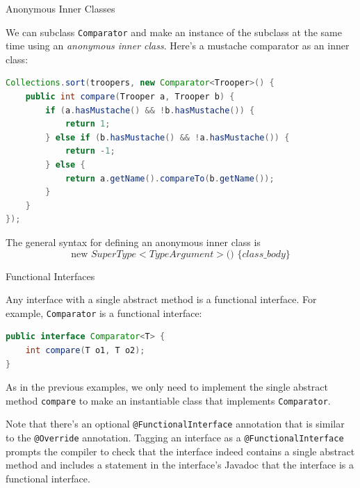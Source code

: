 \documentclass{beamer}
\begin{document}
\begin{frame}[fragile]{Anonymous Inner Classes}

We can subclass {\tt Comparator} and make an instance of the subclass at the same time using an {\it anonymous inner class}.  Here's a mustache comparator as an inner class:

\begin{lstlisting}[language=Java]
Collections.sort(troopers, new Comparator<Trooper>() {
    public int compare(Trooper a, Trooper b) {
        if (a.hasMustache() && !b.hasMustache()) {
            return 1;
        } else if (b.hasMustache() && !a.hasMustache()) {
            return -1;
        } else {
            return a.getName().compareTo(b.getName());
        }
    }
});
\end{lstlisting}

The general syntax for defining an anonymous inner class is
\[
\text{new } SuperType<TypeArgument>\text{() } \{ class\_body \}
\]

\end{frame}

\begin{frame}[fragile]{Functional Interfaces}

Any interface with a single abstract method is a functional interface.  For example, {\tt Comparator} is a functional interface:

\begin{lstlisting}[language=Java]
public interface Comparator<T> {
    int compare(T o1, T o2);
}
\end{lstlisting}

As in the previous examples, we only need to implement the single abstract method {\tt compare} to make an instantiable class that implements {\tt Comparator}.\\

\vspace{.05in}

Note that there's an optional {\tt @FunctionalInterface} annotation that is similar to the {\tt @Override} annotation.  Tagging an interface as a {\tt @FunctionalInterface} prompts the compiler to check that the interface indeed contains a single abstract method and includes a statement in the interface's Javadoc that the interface is a functional interface.

\end{frame}
\end{document}

